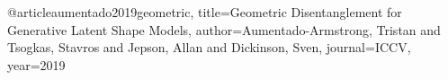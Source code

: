 @article{aumentado2019geometric,
  title={Geometric Disentanglement for Generative Latent Shape Models},
  author={Aumentado-Armstrong, Tristan and Tsogkas, Stavros and Jepson, Allan and Dickinson, Sven},
  journal={ICCV},
  year={2019}
}
